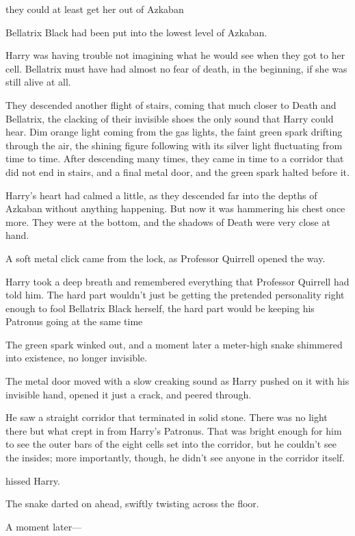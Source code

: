 {\el} they could at least get her out of Azkaban{\el}

Bellatrix Black had been put into the lowest level of Azkaban.

Harry was having trouble not imagining what he would see when they got to her
cell. Bellatrix must have had almost no fear of death, in the beginning, if she
was still alive at all.

They descended another flight of stairs, coming that much closer to Death and
Bellatrix, the clacking of their invisible shoes the only sound that Harry
could hear. Dim orange light coming from the gas lights, the faint green spark
drifting through the air, the shining figure following with its silver light
fluctuating from time to time.
\sbreak
After descending many times, they came in time to a corridor that did not end
in stairs, and a final metal door, and the green spark halted before it.

Harry's heart had calmed a little, as they descended far into the depths of
Azkaban without anything happening. But now it was hammering his chest once
more. They were at the bottom, and the shadows of Death were very close at hand.

A soft metal click came from the lock, as Professor Quirrell opened the way.

Harry took a deep breath and remembered everything that Professor Quirrell had
told him. The hard part wouldn't just be getting the pretended personality
right enough to fool Bellatrix Black herself, the hard part would be keeping
his Patronus going at the same time{\el}

The green spark winked out, and a moment later a meter-high snake shimmered
into existence, no longer invisible.

The metal door moved with a slow creaking sound as Harry pushed on it with his
invisible hand, opened it just a crack, and peered through.

He saw a straight corridor that terminated in solid stone. There was no light
there but what crept in from Harry's Patronus. That was bright enough for him
to see the outer bars of the eight cells set into the corridor, but he couldn't
see the insides; more importantly, though, he didn't see anyone in the corridor
itself.

 hissed Harry.

The snake darted on ahead, swiftly twisting across the floor.

A moment later\mbox{---}

